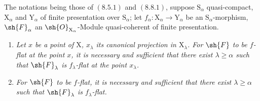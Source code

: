 \begin{theorem}[11.2.6]
\label{IV.11.2.6}
The notations being those of $(8.5.1)$ and $(8.8.1)$, suppose $\mathrm{S}_\alpha$ quasi-compact, $\mathrm{X}_\alpha$ and $\mathrm{Y}_\alpha$ of finite presentation over $\mathrm{S}_\alpha$; let $f_\alpha:\mathrm{X}_\alpha\to\mathrm{Y}_\alpha$ be an $\mathrm{S}_\alpha$-morphism, $\sh{F}_\alpha$ an $\sh{O}_{\mathrm{X}_\alpha}$-Module quasi-coherent of finite presentation.


\begin{enumerate}[label=\emph{(\roman*)}]
  \item \emph{Let $x$ be a point of $\mathrm{X}$, $x_\lambda$ its canonical projection in $\mathrm{X}_\lambda$. For $\sh{F}$ to be $f$-flat at the point $x$, it is necessary and sufficient that there exist $\lambda\geqslant\alpha$ such that $\sh{F}_\lambda$ is $f_\lambda$-flat at the point $x_\lambda$.}
  \item \emph{For $\sh{F}$ to be $f$-flat, it is necessary and sufficient that there exist $\lambda\geqslant\alpha$ such that $\sh{F}_\lambda$ is $f_\lambda$-flat.}
\end{enumerate}
\end{theorem}


